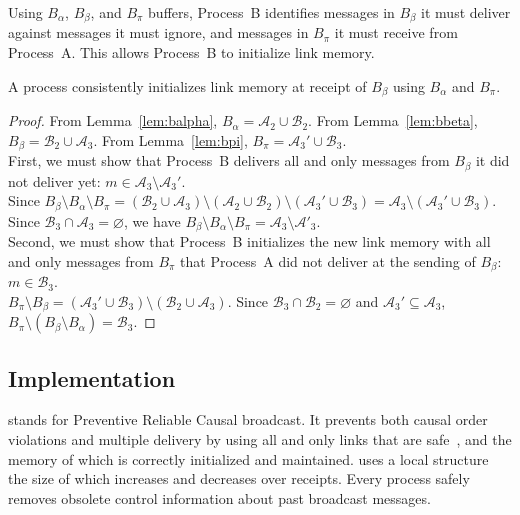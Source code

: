 \noindent Using $B_\alpha$, $B_\beta$, and $B_\pi$ buffers, Process~B identifies
messages in $B_\beta$ it must deliver against messages it must ignore, and
messages in $B_\pi$ it must receive from Process~A. This allows Process~B to
initialize link memory.

\begin{theorem}
  A process consistently initializes link memory at receipt of $B_\beta$ using
  $B_\alpha$ and $B_\pi$.
\end{theorem}

\begin{proof}
  From Lemma~\ref{lem:balpha}, $B_\alpha = \mathcal{A}_2 \cup \mathcal{B}_2$.
  From Lemma~\ref{lem:bbeta}, $B_\beta= \mathcal{B}_2 \cup \mathcal{A}_3$. From
  Lemma~\ref{lem:bpi}, $B_\pi = \mathcal{A}_3' \cup \mathcal{B}_3$. \\
  First, we must show that Process~B delivers all and only messages from
  $B_\beta$ it did not deliver yet:
  $m \in \mathcal{A}_3 \setminus \mathcal{A}_3'$.\\
  Since
  $B_\beta \setminus B_\alpha \setminus B_\pi = (\mathcal{B}_2 \cup
  \mathcal{A}_3) \setminus (\mathcal{A}_2 \cup \mathcal{B}_2) \setminus
  (\mathcal{A}_3' \cup \mathcal{B}_3) = \mathcal{A}_3 \setminus (\mathcal{A}_3'
  \cup \mathcal{B}_3)$.
  Since $\mathcal{B}_3 \cap \mathcal{A}_3 = \varnothing$, we have
  $B_\beta \setminus B_\alpha \setminus B_\pi = \mathcal{A}_3\setminus
  \mathcal{A}'_3$.\\
  Second, we must show that Process~B initializes the new link memory with all
  and only messages from $B_\pi$ that Process~A did not deliver at the sending
  of $B_\beta$: $m\in \mathcal{B}_3$.\\
  $B_\pi \setminus B_\beta = (\mathcal{A}_3' \cup \mathcal{B}_3) \setminus
  (\mathcal{B}_2 \cup \mathcal{A}_3)$.
  Since $\mathcal{B}_3 \cap \mathcal{B}_2 = \varnothing$ and
  $\mathcal{A}_3' \subseteq \mathcal{A}_3$,
  $B_\pi \setminus (B_\beta \setminus B_\alpha) = \mathcal{B}_3$.
\end{proof}

\subsection{Implementation}

\RPCBROADCAST stands for Preventive Reliable Causal broadcast. It prevents both
causal order violations and multiple delivery by using all and only links that
are safe~\cite{nedelec2018pcbroadcast}, and the memory of which is correctly
initialized and maintained.  \RPCBROADCAST uses a local structure the size of
which increases and decreases over receipts. Every process safely removes
obsolete control information about past broadcast messages.

